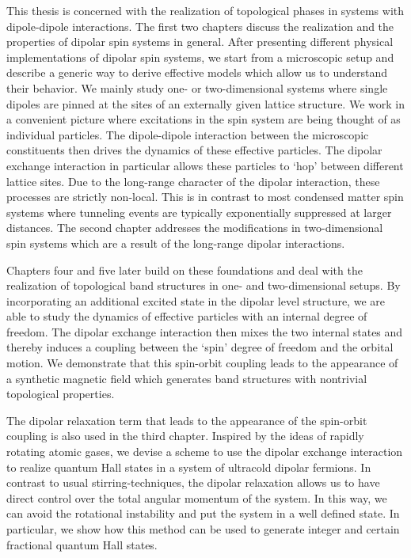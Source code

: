 This thesis is concerned with the realization of topological phases in systems with dipole-dipole interactions.
The first two chapters discuss the realization and the properties of dipolar spin systems in general.
After presenting different physical implementations of dipolar spin systems, we start from a microscopic setup and describe a generic way to derive effective models which allow us to understand their behavior.
We mainly study one- or two-dimensional systems where single dipoles are pinned at the sites of an externally given lattice structure.
We work in a convenient picture where excitations in the spin system are being thought of as individual particles.
The dipole-dipole interaction between the microscopic constituents then drives the dynamics of these effective particles.
The dipolar exchange interaction in particular allows these particles to `hop' between different lattice sites.
Due to the long-range character of the dipolar interaction, these processes are strictly non-local.
This is in contrast to most condensed matter spin systems where tunneling events are typically exponentially suppressed at larger distances.
The second chapter addresses the modifications in two-dimensional spin systems which are a result of the long-range dipolar interactions.

Chapters four and five later build on these foundations and deal with the realization of topological band structures in one- and two-dimensional setups.
By incorporating an additional excited state in the dipolar level structure, we are able to study the dynamics of effective particles with an internal degree of freedom.
The dipolar exchange interaction then mixes the two internal states and thereby induces a coupling between the `spin' degree of freedom and the orbital motion.
We demonstrate that this spin-orbit coupling leads to the appearance of a synthetic magnetic field which generates band structures with nontrivial topological properties.

The dipolar relaxation term that leads to the appearance of the spin-orbit coupling is also used in the third chapter.
Inspired by the ideas of rapidly rotating atomic gases, we devise a scheme to use the dipolar exchange interaction to realize quantum Hall states in a system of ultracold dipolar fermions.
In contrast to usual stirring-techniques, the dipolar relaxation allows us to have direct control over the total angular momentum of the system.
In this way, we can avoid the rotational instability and put the system in a well defined state.
In particular, we show how this method can be used to generate integer and certain fractional quantum Hall states.

